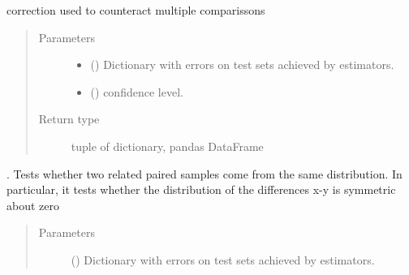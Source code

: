 \documentclass[letterpaper,10pt,english]{sphinxmanual}
\begin{document}
\begin{fulllineitems}
\begin{fulllineitems}
\begin{quote}
\begin{description}
\end{description}\end{quote}

\end{fulllineitems}


\begin{fulllineitems}
\label{\detokenize{analyze_results:mleap.analyze_results.analyze_results.AnalyseResults.t_test_with_bonferroni_correction}}
correction used to counteract multiple comparissons
\begin{quote}\begin{description}
\item[{Parameters}] \leavevmode\begin{itemize}
\item {} 
 () \textendash{} Dictionary with errors on test sets achieved by estimators.

\item {} 
 () \textendash{} confidence level.

\end{itemize}

\item[{Return type}] \leavevmode
tuple of dictionary, pandas DataFrame

\end{description}\end{quote}

\end{fulllineitems}


\begin{fulllineitems}
\label{\detokenize{analyze_results:mleap.analyze_results.analyze_results.AnalyseResults.wilcoxon_test}}
.
Tests whether two  related paired samples come from the same distribution. 
In particular, it tests whether the distribution of the differences x-y is symmetric about zero
\begin{quote}\begin{description}
\item[{Parameters}] \leavevmode
{} () \textendash{} Dictionary with errors on test sets achieved by estimators.


\end{description}
\end{quote}
\end{fulllineitems}
\end{fulllineitems}
\end{document}
